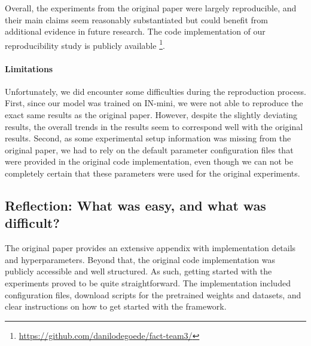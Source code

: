 Overall, the experiments from the original paper were largely reproducible, and their main claims seem reasonably substantiated but could benefit from additional evidence in future research. The code implementation of our reproducibility study
is publicly available
\footnote{\url{https://github.com/danilodegoede/fact-team3/}}. 

\paragraph{Limitations}
Unfortunately, we did encounter some difficulties during the reproduction process. First, since our model was trained on IN-mini, we were not able to reproduce the exact same results as the original paper. However, despite the slightly deviating results, the overall trends in the results seem to correspond well with the original results. Second, as some experimental setup information was missing from the original paper, we had to rely on the default parameter configuration files that were provided in the original code implementation, even though we can not be completely certain that these parameters were used for the original experiments. 


\subsection{Reflection: What was easy, and what was difficult?}


The original paper provides an extensive appendix with implementation details and hyperparameters. Beyond that, the original code implementation was publicly accessible and well structured. As such, getting started with the experiments proved to be quite straightforward. The implementation included configuration files, download scripts for the pretrained weights and datasets, and clear instructions on how to get started with the framework.

